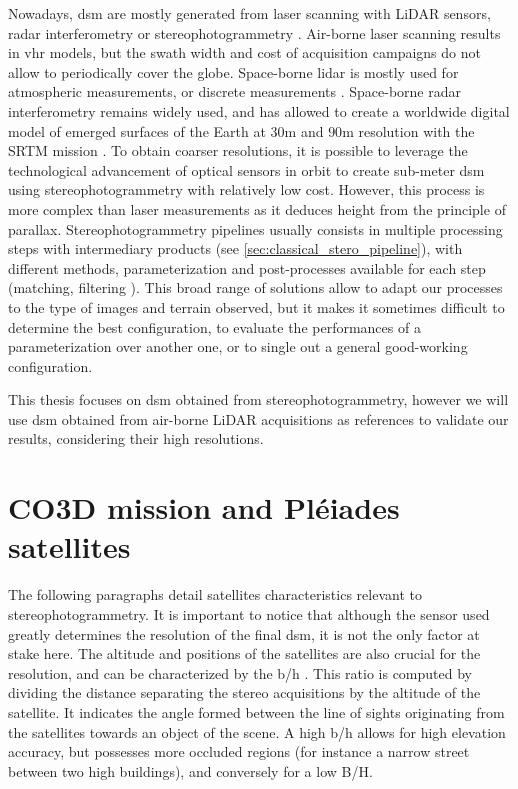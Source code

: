 Nowadays, \acrshort{dsm} are mostly generated from laser scanning with LiDAR sensors, radar interferometry or stereophotogrammetry \cite{youssefi_cars_2020}. Air-borne laser scanning results in \acrfull{vhr} models, but the swath width and cost of acquisition campaigns do not allow to periodically cover the globe. Space-borne \acrshort{lidar} is mostly used for atmospheric measurements, or discrete measurements \cite{fouladinejad_history_2019} . Space-borne radar interferometry remains widely used, and has allowed to create a worldwide digital model of emerged surfaces of the Earth at $30$m and $90$m resolution with the SRTM mission \cite{farr_shuttle_2007}. To obtain coarser resolutions, it is possible to leverage the technological advancement of optical sensors in orbit to create sub-meter \acrshort{dsm} using stereophotogrammetry with relatively low cost. However, this process is more complex than laser measurements as it deduces height from the principle of parallax. Stereophotogrammetry pipelines usually consists in multiple processing steps with intermediary products (see \ref{sec:classical_stero_pipeline}), with different methods, parameterization and post-processes available for each step (\eg matching, filtering \etc). This broad range of solutions allow to adapt our processes to the type of images and terrain observed, but it makes it sometimes difficult to determine the best configuration, to evaluate the performances of a parameterization over another one, or to single out a general good-working configuration. 

This thesis focuses on \acrshort{dsm} obtained from stereophotogrammetry, however we will use \acrshort{dsm} obtained from air-borne LiDAR acquisitions as references to validate our results, considering their high resolutions.

\section{CO3D mission and Pléiades satellites}
The following paragraphs detail satellites characteristics relevant to stereophotogrammetry. It is important to notice that although the sensor used greatly determines the resolution of the final \acrshort{dsm}, it is not the only factor at stake here. The altitude and positions of the satellites are also crucial for the resolution, and can be characterized by the \acrfull{b/h} . This ratio is computed by dividing the distance separating the stereo acquisitions by the altitude of the satellite. It indicates the angle formed between the line of sights originating from the satellites towards an object of the scene. A high \acrshort{b/h} allows for high elevation accuracy, but possesses more occluded regions (for instance a narrow street between two high buildings), and conversely for a low B/H. 

